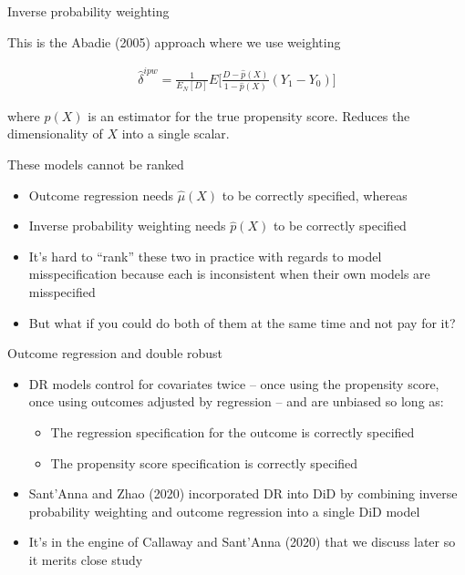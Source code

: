 \documentclass{beamer}
\begin{document}
\begin{frame}{Inverse probability weighting}

This is the Abadie (2005) approach where we use weighting

\begin{eqnarray*}
\widehat{\delta}^{ipw} = \frac{1}{E_N[D]} E \bigg [ \frac{D-\widehat{p}(X)}{1-\widehat{p}(X)} (Y_1-Y_0) \bigg ]
\end{eqnarray*}

where $\widehat{p}(X)$ is an estimator for the true propensity score. Reduces the dimensionality of $X$ into a single scalar.

\end{frame}

\begin{frame}{These models cannot be ranked}

\begin{itemize}
\item Outcome regression needs $\widehat{\mu}(X)$ to be correctly specified, whereas
\item Inverse probability weighting needs $\widehat{p}(X)$ to be correctly specified
\item It's hard to ``rank'' these two in practice with regards to model misspecification because each is inconsistent when their own models are misspecified
\item But what if you could do both of them at the same time and not pay for it?
\end{itemize}

\end{frame}

\begin{frame}{Outcome regression and double robust}

\begin{itemize}
\item DR models control for covariates twice -- once using the propensity score, once using outcomes adjusted by regression -- and are unbiased so long as:
	\begin{itemize}
	\item The regression specification for the outcome is correctly specified
	\item The propensity score specification is correctly specified
	\end{itemize}
\item Sant'Anna and Zhao (2020) incorporated DR into DiD by combining inverse probability weighting and outcome regression into a single DiD model
\item It's in the engine of Callaway and Sant'Anna (2020) that we discuss later so it merits close study
\end{itemize}

\end{frame}
\end{document}

